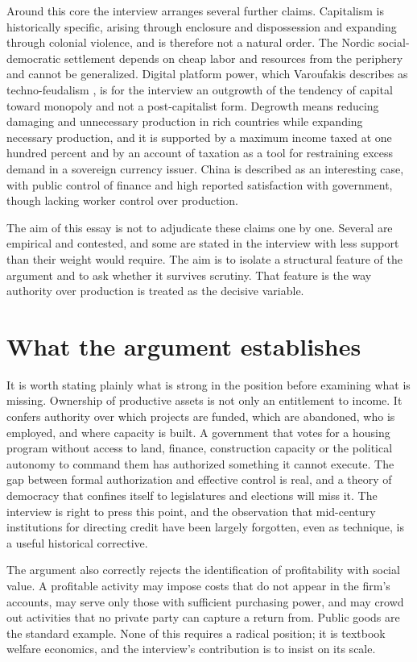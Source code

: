\documentclass[12pt]{article}
\theoremstyle{definition}
\begin{document}
Around this core the interview arranges several further claims. Capitalism is historically specific, arising through enclosure and dispossession and expanding through colonial violence, and is therefore not a natural order. The Nordic social-democratic settlement depends on cheap labor and resources from the periphery and cannot be generalized. Digital platform power, which Varoufakis describes as techno-feudalism \cite{varoufakis2023}, is for the interview an outgrowth of the tendency of capital toward monopoly and not a post-capitalist form. Degrowth \cite{hickel2020} means reducing damaging and unnecessary production in rich countries while expanding necessary production, and it is supported by a maximum income taxed at one hundred percent and by an account of taxation as a tool for restraining excess demand in a sovereign currency issuer. China is described as an interesting case, with public control of finance and high reported satisfaction with government, though lacking worker control over production.

The aim of this essay is not to adjudicate these claims one by one. Several are empirical and contested, and some are stated in the interview with less support than their weight would require. The aim is to isolate a structural feature of the argument and to ask whether it survives scrutiny. That feature is the way authority over production is treated as the decisive variable.

\section{What the argument establishes}

It is worth stating plainly what is strong in the position before examining what is missing. Ownership of productive assets is not only an entitlement to income. It confers authority over which projects are funded, which are abandoned, who is employed, and where capacity is built. A government that votes for a housing program without access to land, finance, construction capacity or the political autonomy to command them has authorized something it cannot execute. The gap between formal authorization and effective control is real, and a theory of democracy that confines itself to legislatures and elections will miss it. The interview is right to press this point, and the observation that mid-century institutions for directing credit have been largely forgotten, even as technique, is a useful historical corrective.

The argument also correctly rejects the identification of profitability with social value. A profitable activity may impose costs that do not appear in the firm's accounts, may serve only those with sufficient purchasing power, and may crowd out activities that no private party can capture a return from. Public goods are the standard example. None of this requires a radical position; it is textbook welfare economics, and the interview's contribution is to insist on its scale.
\end{document}
